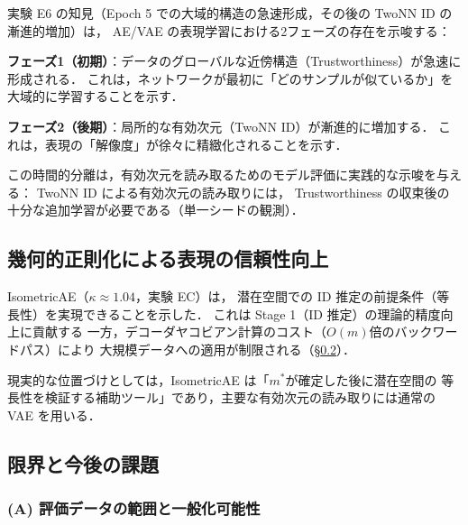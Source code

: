 \documentclass[11pt,a4paper]{jsarticle}
\newcommand{\dzopt}{m^*}
\newcommand{\kap}{\kappa}
\begin{document}
実験 E6 の知見（Epoch 5 での大域的構造の急速形成，その後の TwoNN ID の漸進的増加）は，
AE/VAE の表現学習における2フェーズの存在を示唆する：

\textbf{フェーズ1（初期）}：データのグローバルな近傍構造（Trustworthiness）が急速に形成される．
これは，ネットワークが最初に「どのサンプルが似ているか」を大域的に学習することを示す．

\textbf{フェーズ2（後期）}：局所的な有効次元（TwoNN ID）が漸進的に増加する．
これは，表現の「解像度」が徐々に精緻化されることを示す．

この時間的分離は，有効次元を読み取るためのモデル評価に実践的な示唆を与える：
TwoNN ID による有効次元の読み取りには，
Trustworthiness の収束後の十分な追加学習が必要である（単一シードの観測）．

\subsection{幾何的正則化による表現の信頼性向上}\label{sec:disc_isometric}

IsometricAE（$\kap \approx 1.04$，実験 EC）は，
潜在空間での ID 推定の前提条件（等長性）を実現できることを示した．
これは Stage 1（ID 推定）の理論的精度向上に貢献する
一方，デコーダヤコビアン計算のコスト（$O(m)$倍のバックワードパス）により
大規模データへの適用が制限される（§\ref{sec:disc_limitation}）．

現実的な位置づけとしては，IsometricAE は「$\dzopt$が確定した後に潜在空間の
等長性を検証する補助ツール」であり，主要な有効次元の読み取りには通常の VAE を用いる．

\subsection{限界と今後の課題}\label{sec:disc_limitation}

\subsubsection*{(A) 評価データの範囲と一般化可能性}
\end{document}
